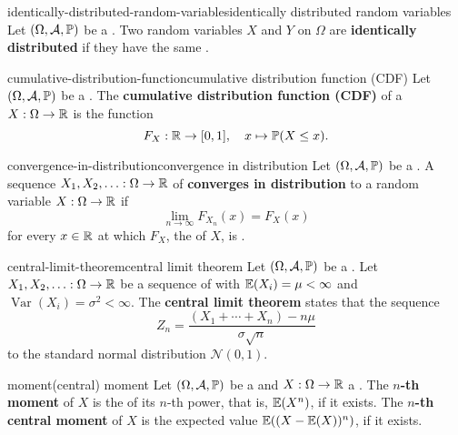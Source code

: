 \begin{topic}{identically-distributed-random-variables}{identically distributed random variables}
    Let $(\Omega, \mathcal{A}, \mathbb{P})$ be a . Two random variables $X$ and $Y$ on $\Omega$ are \textbf{identically distributed} if they have the same .
\end{topic}

\begin{topic}{cumulative-distribution-function}{cumulative distribution function (CDF)}
    Let $(\Omega, \mathcal{A}, \mathbb{P})$ be a . The \textbf{cumulative distribution function (CDF)} of a  $X : \Omega \to \mathbb{R}$ is the function
    \[ F_X : \mathbb{R} \to [0, 1], \quad x \mapsto \mathbb{P}(X \le x) . \]
\end{topic}

\begin{topic}{convergence-in-distribution}{convergence in distribution}
    Let $(\Omega, \mathcal{A}, \mathbb{P})$ be a . A sequence $X_1, X_2, \ldots : \Omega \to \mathbb{R}$ of  \textbf{converges in distribution} to a random variable $X : \Omega \to \mathbb{R}$ if
    \[ \lim_{n \to \infty} F_{X_n}(x) = F_X(x) \]
    for every $x \in \mathbb{R}$ at which $F_X$, the  of $X$, is . 
\end{topic}

\begin{topic}{central-limit-theorem}{central limit theorem}
    Let $(\Omega, \mathcal{A}, \mathbb{P})$ be a . Let $X_1, X_2, \ldots : \Omega \to \mathbb{R}$ be a sequence of    with  $\mathbb{E}(X_i) = \mu < \infty$ and  $\operatorname{Var}(X_i) = \sigma^2 < \infty$. The \textbf{central limit theorem} states that the sequence
    \[ Z_n = \frac{(X_1 + \cdots + X_n) - n \mu}{\sigma \sqrt{n}} \]
     to the standard normal distribution $\mathcal{N}(0, 1)$.
\end{topic}

\begin{topic}{moment}{(central) moment}
    Let $(\Omega, \mathcal{A}, \mathbb{P})$ be a  and $X : \Omega \to \mathbb{R}$ a . The \textbf{$n$-th moment} of $X$ is the  of its $n$-th power, that is, $\mathbb{E}(X^n)$, if it exists. The \textbf{$n$-th central moment} of $X$ is the expected value $\mathbb{E}((X - \mathbb{E}(X))^n)$, if it exists. 
\end{topic}

